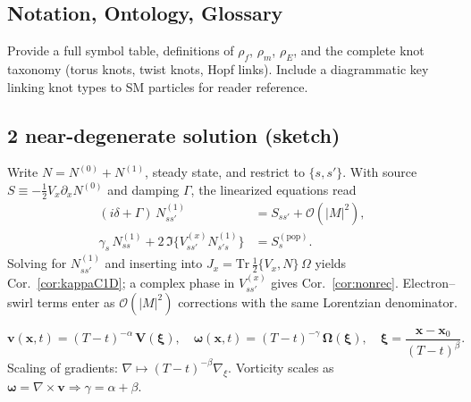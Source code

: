 \subsection{Notation, Ontology, Glossary}
\label{canon58:appI}
Provide a full symbol table, definitions of $\rho_{\!f}$, $\rho_{\!m}$, $\rho_{\!E}$,
and the complete knot taxonomy (torus knots, twist knots, Hopf links).
Include a diagrammatic key linking knot types to SM particles for reader reference.

\subsection{ 2 near-degenerate solution (sketch)}
Write $N=N^{(0)}+N^{(1)}$, steady state, and restrict to $\{s,s'\}$. With source $S\equiv -\tfrac12 V_x\partial_x N^{(0)}$ and damping $\Gamma$, the linearized equations read
\begin{align}
(i\delta+\Gamma)\,N^{(1)}_{ss'} &= S_{ss'} + \mathcal O(|M|^2),\\
\gamma_s\,N^{(1)}_{ss} + 2\,\Im\{V^{(x)}_{ss'}N^{(1)}_{s's}\} &= S^{(\mathrm{pop})}_s.
\end{align}
Solving for $N^{(1)}_{ss'}$ and inserting into $J_x=\mathrm{Tr}\,\tfrac12\{V_x,N\}\,\Omega$ yields Cor.~\ref{cor:kappaC1D}; a complex phase in $V^{(x)}_{ss'}$ gives Cor.~\ref{cor:nonrec}. Electron–swirl terms enter as $\mathcal O(|M|^2)$ corrections with the same Lorentzian denominator.


%
\[
    \mathbf{v}(\mathbf{x},t) = (T-t)^{-\alpha}\, \mathbf{V}\!\left(\boldsymbol{\xi}\right),\quad
    \boldsymbol{\omega}(\mathbf{x},t) = (T-t)^{-\gamma}\, \boldsymbol{\Omega}\!\left(\boldsymbol{\xi}\right),\quad
    \boldsymbol{\xi} = \frac{\mathbf{x}-\mathbf{x}_0}{(T-t)^{\beta}} .
\]
Scaling of gradients: \(\nabla \mapsto (T-t)^{-\beta}\nabla_{\!\xi}\).
Vorticity scales as \(\boldsymbol{\omega}=\nabla\times\mathbf{v}\Rightarrow \gamma=\alpha+\beta\).

